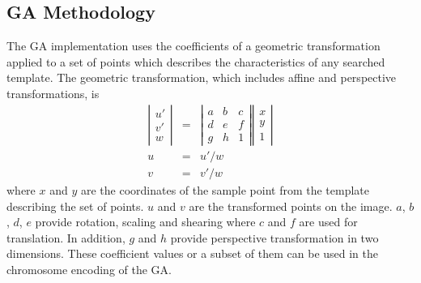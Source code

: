 \documentclass[twocolumn,letterpaper,10pt]{article}
\begin{document}
\subsection{GA Methodology}
The GA implementation uses the coefficients of a geometric transformation applied to a set of points which describes the characteristics of any searched template. The geometric transformation, which includes affine and perspective transformations, is
\begin{eqnarray}
\label{eq2}
\left| \begin{array}{ccc} u' \\ v' \\ w \end{array} \right| &=& 
\left| \begin{array}{ccc} a & b & c \\ d & e & f \\ g & h & 1 \end{array} \right| \left| \begin{array}{ccc} x \\ y \\ 1 \end{array} \right| \\
u &=& u'/w \\
v &=& v'/w 
\end{eqnarray}
\noindent where $x$ and $y$ are the coordinates of the sample point from the template describing the set of points. $u$ and $v$ are the transformed points on the image. $a$, $b$, $d$, $e$  provide rotation, scaling and shearing where $c$ and $f$ are used for translation. In addition, $g$ and $h$ provide perspective transformation in two dimensions. These coefficient values or a subset of them can be used in the chromosome encoding of the GA.
\end{document}
